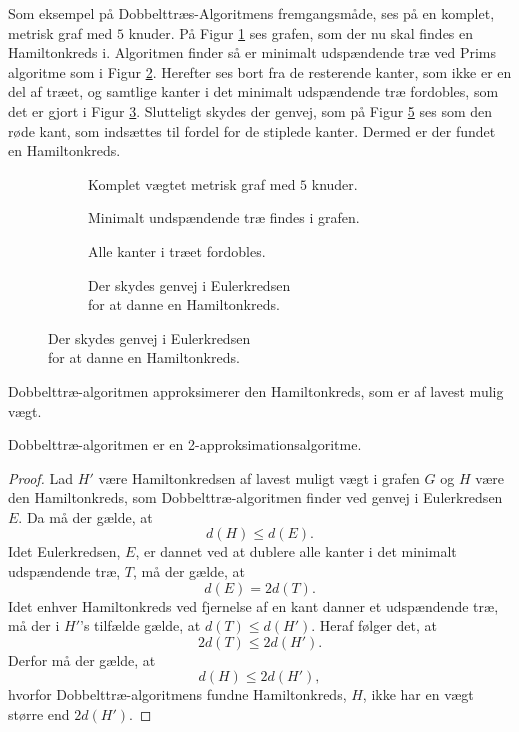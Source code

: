 \begin{exmp}
Som eksempel på Dobbelttræs-Algoritmens fremgangsmåde, ses på en komplet, metrisk graf med $5$ knuder.
På Figur \ref{dtex1} ses grafen, som der nu skal findes en Hamiltonkreds i. Algoritmen finder så er minimalt udspændende træ ved Prims algoritme som i Figur \ref{dtex2}. Herefter ses bort fra de resterende kanter, som ikke er en del af træet, og samtlige kanter i det minimalt udspændende træ fordobles, som det er gjort i Figur \ref{dtex3}. Slutteligt skydes der genvej, som på Figur \ref{dtex4} ses som den røde kant, som indsættes til fordel for de stiplede kanter. Dermed er der fundet en Hamiltonkreds.

\begin{figure}[h]
\centering
	\begin{subfigure}{0.5\textwidth}
		\centering
			\scalebox{0.7}{}
		\label{dtex1}
		\caption{Komplet vægtet metrisk graf med $5$ knuder.}
	\end{subfigure}%
	\begin{subfigure}{0.5\textwidth}
		\centering
			\scalebox{0.7}{}
		\label{dtex2}
		\caption{Minimalt undspændende træ findes i grafen.}
	\end{subfigure}
	\newline
	\begin{subfigure}{0.5\textwidth}
		\centering		
			\scalebox{0.7}{}
		\label{dtex3}
		\caption{Alle kanter i træet fordobles.}
	\end{subfigure}%
	\begin{subfigure}{0.5\textwidth}
		\centering
			\scalebox{0.7}{}
		\label{dtex4}
		\caption{Der skydes genvej i Eulerkredsen\\ for at
		danne en Hamiltonkreds.}
	\end{subfigure}
\end{figure}
\end{exmp}

Dobbelttræ-algoritmen approksimerer den Hamiltonkreds, som er af lavest mulig vægt.

\begin{thm}
Dobbelttræ-algoritmen er en 2-approksimationsalgoritme.
\end{thm}

\begin{proof}
Lad $H'$ være Hamiltonkredsen af lavest muligt vægt i grafen $G$ og $H$ være den Hamiltonkreds, som Dobbelttræ-algoritmen finder ved genvej i Eulerkredsen $E$. Da må der gælde, at $$d(H)\leq d(E).$$ 
Idet Eulerkredsen, $E$, er dannet ved at dublere alle kanter i det minimalt udspændende træ, $T$, må der gælde, at $$d(E) = 2d(T).$$
Idet enhver Hamiltonkreds ved fjernelse af en kant danner et udspændende træ, må der i $H'$'s tilfælde gælde, at $d(T) \leq d(H')$. Heraf følger det, at $$2d(T) \leq 2d(H').$$
Derfor må der gælde, at $$d(H) \leq 2d(H'),$$ hvorfor Dobbelttræ-algoritmens fundne Hamiltonkreds, $H$, ikke har en vægt større end $2d(H')$. 
\end{proof}

